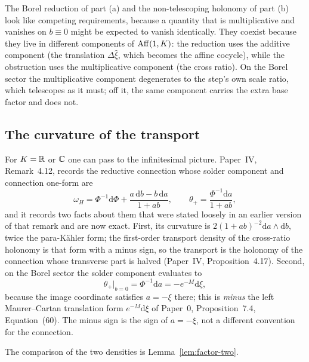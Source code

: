 \begin{remark}
\label{rem:two-demands}
The Borel reduction of part (a) and the non-telescoping holonomy of part (b) look
like competing requirements, because a quantity that is multiplicative and
vanishes on $b\equiv0$ might be expected to vanish identically.  They coexist
because they live in different components of $\operatorname{Aff}(1,K)$: the reduction uses the
additive component (the translation $\Delta\hat\xi$, which becomes the affine
cocycle), while the obstruction uses the multiplicative component (the cross
ratio).  On the Borel sector the multiplicative component degenerates to the
step's own scale ratio, which telescopes as it must; off it, the same component
carries the extra base factor and does not.
\end{remark}

\subsection{The curvature of the transport}

For $K=\mathbb{R}$ or $\mathbb{C}$ one can pass to the infinitesimal picture.  Paper~IV,
Remark~4.12, records the reductive connection whose solder component and
connection one-form are
\begin{equation}\label{eq:connection}
  \omega_H=\Phi^{-1}\mathrm d\Phi+\frac{a\,\mathrm db-b\,\mathrm da}{1+ab},
  \qquad
  \theta_+=\frac{\Phi^{-1}\mathrm da}{1+ab},
\end{equation}
and it records two facts about them that were stated loosely in an earlier
version of that remark and are now exact.  First, its curvature is
$2(1+ab)^{-2}\mathrm da\wedge\mathrm db$, twice the para-K\"ahler form; the
first-order transport density of the cross-ratio holonomy is that form with a
minus sign, so the transport is the holonomy of the connection whose transverse
part is halved (Paper~IV, Proposition~4.17).  Second, on the Borel sector the
solder component evaluates to
\begin{equation}\label{eq:solder-borel}
  \theta_+\big|_{b=0}=\Phi^{-1}\mathrm da=-e^{-M}\mathrm d\xi ,
\end{equation}
because the image coordinate satisfies $a=-\xi$ there; this is \emph{minus} the
left Maurer--Cartan translation form $e^{-M}\mathrm d\xi$ of Paper~0,
Proposition~7.4, Equation~(60).  The minus sign is the sign of $a=-\xi$, not a
different convention for the connection.

The comparison of the two densities is Lemma~\ref{lem:factor-two}.

